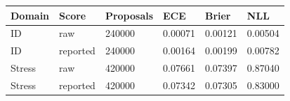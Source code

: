 \begin{tabular}{llllll}
\toprule
Domain & Score & Proposals & ECE & Brier & NLL \\
\midrule
ID & raw & 240000 & 0.00071 & 0.00121 & 0.00504 \\
ID & reported & 240000 & 0.00164 & 0.00199 & 0.00782 \\
Stress & raw & 420000 & 0.07661 & 0.07397 & 0.87040 \\
Stress & reported & 420000 & 0.07342 & 0.07305 & 0.83000 \\
\bottomrule
\end{tabular}
